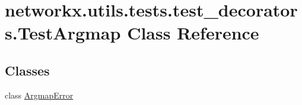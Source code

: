 \hypertarget{classnetworkx_1_1utils_1_1tests_1_1test__decorators_1_1TestArgmap}{}\section{networkx.\+utils.\+tests.\+test\+\_\+decorators.\+Test\+Argmap Class Reference}
\label{classnetworkx_1_1utils_1_1tests_1_1test__decorators_1_1TestArgmap}
\subsection*{Classes}
\begin{DoxyCompactItemize}
\item 
class \hyperlink{classnetworkx_1_1utils_1_1tests_1_1test__decorators_1_1TestArgmap_1_1ArgmapError}{Argmap\+Error}
\end{DoxyCompactItemize}

